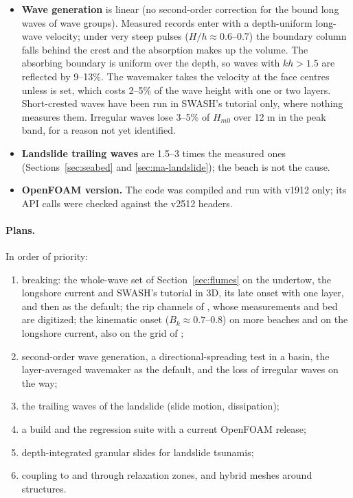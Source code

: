 \begin{itemize}[nosep]
        does not replace the breaking eddy viscosity.
  \item \textbf{Wave generation} is linear (no second-order correction
        for the bound long waves of wave groups). Measured records enter
        with a depth-uniform long-wave velocity; under very steep pulses
        ($H/h \approx 0.6$--0.7) the boundary column falls behind the
        crest and the absorption makes up the volume. The absorbing boundary
        is uniform over the depth, so waves with $kh > 1.5$ are reflected
        by 9--13\%. The wavemaker takes the velocity at the face centres
        unless  is set, which costs 2--5\% of the wave
        height with one or two layers. Short-crested waves have been run
        in SWASH's tutorial only, where nothing measures them.
        Irregular waves lose 3--5\% of $H_{m0}$ over 12 m in the peak band,
        for a reason not yet identified.
  \item \textbf{Landslide trailing waves} are 1.5--3 times the measured ones
        (Sections~\ref{sec:seabed} and \ref{sec:ma-landslide}); the beach is
        not the cause.
  \item \textbf{OpenFOAM version.} The code was compiled and run with
        v1912 only; its API calls were checked against the v2512 headers.
\end{itemize}

\paragraph{Plans.} In order of priority:
\begin{enumerate}[nosep]
  \item breaking: the whole-wave set of Section~\ref{sec:flumes} on the
        undertow, the longshore current and SWASH's tutorial in 3D, its
        late onset with one layer, and then as the default; the rip
        channels of \citet{haller2002}, whose measurements and bed are
        digitized; the
        kinematic onset ($B_k \approx 0.7$--0.8) on more beaches and on the
        longshore current, also on the grid of \citet{ma2012};
  \item second-order wave generation, a directional-spreading test in
        a basin, the layer-averaged wavemaker as the default, and the
        loss of irregular waves on the way;
  \item the trailing waves of the landslide (slide motion, dissipation);
  \item a build and the regression suite with a current OpenFOAM release;
  \item depth-integrated granular slides for landslide tsunamis;
  \item coupling to  and  through relaxation
        zones, and hybrid meshes around structures.
\end{enumerate}
